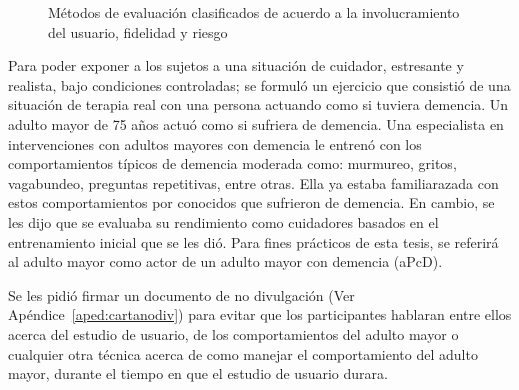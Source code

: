 \begin{figure}[h]
        \centering
	\caption{M\'etodos de evaluaci\'on clasificados de acuerdo a la involucramiento del usuario, fidelidad y riesgo \protect\citep{Castro11} }\label{fig:evalmethods}
\end{figure}


Para poder exponer a los sujetos a una situaci\'on de cuidador, estresante y realista, bajo condiciones controladas; se formul\'o un ejercicio que consisti\'o de una situaci\'on de terapia real con una persona actuando como si tuviera demencia. Un adulto mayor de 75 a\~nos actu\'o como si sufriera de demencia. Una especialista en intervenciones con adultos mayores con demencia le entren\'o con los comportamientos t\'ipicos de demencia moderada como: murmureo, gritos, vagabundeo, preguntas repetitivas, entre otras. Ella ya estaba familiarazada con estos comportamientos por conocidos que sufrieron de demencia. En cambio, se les dijo que se evaluaba su rendimiento como cuidadores basados en el entrenamiento inicial que se les di\'o. Para fines pr\'acticos de esta tesis, se referir\'a al adulto mayor como actor de un adulto mayor con demencia (aPcD).

Se les pidi\'o firmar un documento de no divulgaci\'on (Ver Ap\'endice~\ref{aped:cartanodiv}) para evitar que los participantes hablaran entre ellos acerca del estudio de usuario, de los comportamientos del adulto mayor o cualquier otra t\'ecnica acerca de como manejar el comportamiento del adulto mayor, durante el tiempo en que el estudio de usuario durara.

